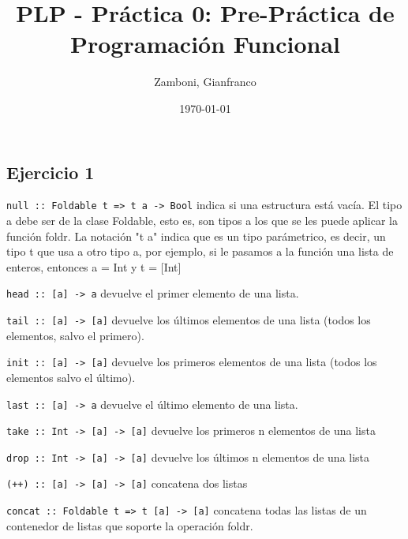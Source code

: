 \documentclass[10pt,a4paper]{article}
\begin{document}
\title{PLP - Práctica 0: Pre-Práctica de Programación Funcional}

\date{\today}

\author{Zamboni, Gianfranco}

\maketitle
\setcounter{page}{1}

\subsection{Ejercicio 1}
\texttt{null :: Foldable t => t a -> Bool} indica si una estructura está vacía. El tipo a debe ser de la clase Foldable, esto es, son tipos a los que se les puede aplicar la función foldr. La notación "t a" indica que es un tipo parámetrico, es decir, un tipo t que usa a otro tipo a, por ejemplo, si le pasamos a la función una lista de enteros, entonces a = Int y t = [Int]

\vspace*{5mm}
\texttt{head :: [a] -> a} devuelve el primer elemento de una lista.

\vspace*{5mm}
\texttt{tail :: [a] -> [a]} devuelve los últimos elementos de una lista (todos los elementos, salvo el primero).

\vspace*{5mm}
\texttt{init :: [a] -> [a]} devuelve los primeros elementos de una lista (todos los elementos salvo el último).

\vspace*{5mm}
\texttt{last :: [a] -> a} devuelve el último elemento de una lista.


\vspace*{5mm}
\texttt{take :: Int -> [a] -> [a]} devuelve los primeros n elementos de una lista

\vspace*{5mm}
\texttt{drop :: Int -> [a] -> [a]} devuelve los últimos n elementos de una lista

\vspace*{5mm}
\texttt{(++) :: [a] -> [a] -> [a]} concatena dos listas

\vspace*{5mm}
\texttt{concat :: Foldable t => t [a] -> [a]} concatena todas las listas de un contenedor de listas que soporte la operación foldr.
\end{document}
